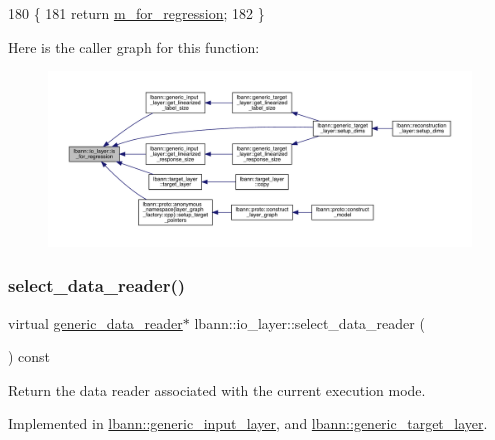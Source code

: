 \begin{DoxyCode}
180                                  \{
181     \textcolor{keywordflow}{return} \hyperlink{classlbann_1_1io__layer_aa1410291168d197a59b47815cced48d4}{m\_for\_regression};
182   \}
\end{DoxyCode}
Here is the caller graph for this function\+:\nopagebreak
\begin{figure}[H]
\begin{center}
\leavevmode
\includegraphics[width=350pt]{classlbann_1_1io__layer_a61f2e00334c820235795154492876476_icgraph}
\end{center}
\end{figure}
\mbox{\label{classlbann_1_1io__layer_aed46cd991ff11bad08933dc61492e26f}} 
\subsubsection{\texorpdfstring{select\+\_\+data\+\_\+reader()}{select\_data\_reader()}}
{\footnotesize\ttfamily virtual \hyperlink{classlbann_1_1generic__data__reader}{generic\+\_\+data\+\_\+reader}$\ast$ lbann\+::io\+\_\+layer\+::select\+\_\+data\+\_\+reader (\begin{DoxyParamCaption}{ }\end{DoxyParamCaption}) const\hspace{0.3cm}{\ttfamily [pure virtual]}}

Return the data reader associated with the current execution mode. 

Implemented in \hyperlink{classlbann_1_1generic__input__layer_a9783805369ec7cfe5ce61c81baa5d2e2}{lbann\+::generic\+\_\+input\+\_\+layer}, and \hyperlink{classlbann_1_1generic__target__layer_a9591bdc69e3de9c10fbf71d1faef917a}{lbann\+::generic\+\_\+target\+\_\+layer}.

